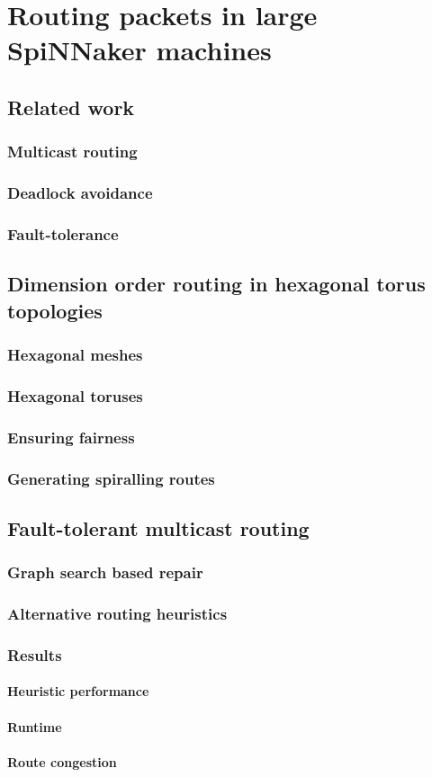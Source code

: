 \chapter{Routing packets in large SpiNNaker machines}
	
	\section{Related work}
		\subsection{Multicast routing}
		\subsection{Deadlock avoidance}
		\subsection{Fault-tolerance}
	
	\section{Dimension order routing in hexagonal torus topologies}
		\subsection{Hexagonal meshes}
		\subsection{Hexagonal toruses}
		\subsection{Ensuring fairness}
		\subsection{Generating spiralling routes}
	
	\section{Fault-tolerant multicast routing}
		\subsection{Graph search based repair}
		\subsection{Alternative routing heuristics}
		\subsection{Results}
			\subsubsection{Heuristic performance}
			\subsubsection{Runtime}
			\subsubsection{Route congestion}
	
